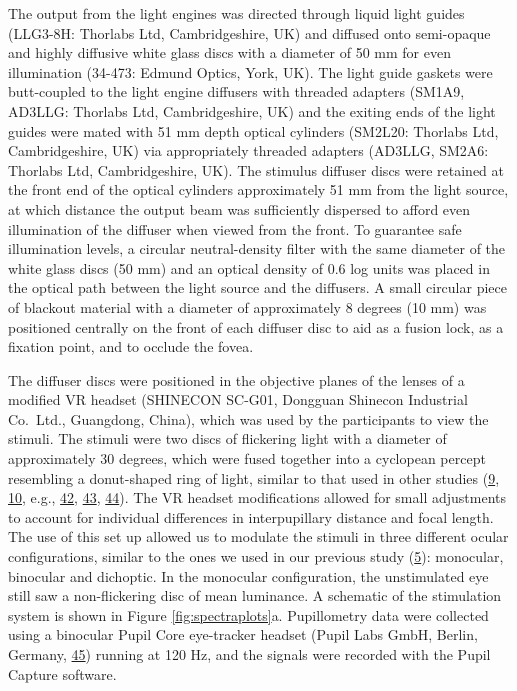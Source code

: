 \documentclass[
]{article}
\begin{document}
The output from the light engines was directed through liquid light guides (LLG3-8H: Thorlabs Ltd, Cambridgeshire, UK) and diffused onto semi-opaque and highly diffusive white glass discs with a diameter of 50 mm for even illumination (34-473: Edmund Optics, York, UK). The light guide gaskets were butt-coupled to the light engine diffusers with threaded adapters (SM1A9, AD3LLG: Thorlabs Ltd, Cambridgeshire, UK) and the exiting ends of the light guides were mated with 51 mm depth optical cylinders (SM2L20: Thorlabs Ltd, Cambridgeshire, UK) via appropriately threaded adapters (AD3LLG, SM2A6: Thorlabs Ltd, Cambridgeshire, UK). The stimulus diffuser discs were retained at the front end of the optical cylinders approximately 51 mm from the light source, at which distance the output beam was sufficiently dispersed to afford even illumination of the diffuser when viewed from the front. To guarantee safe illumination levels, a circular neutral-density filter with the same diameter of the white glass discs (50 mm) and an optical density of 0.6 log units was placed in the optical path between the light source and the diffusers. A small circular piece of blackout material with a diameter of approximately 8 degrees (10 mm) was positioned centrally on the front of each diffuser disc to aid as a fusion lock, as a fixation point, and to occlude the fovea.

The diffuser discs were positioned in the objective planes of the lenses of a modified VR headset (SHINECON SC-G01, Dongguan Shinecon Industrial Co.~Ltd., Guangdong, China), which was used by the participants to view the stimuli. The stimuli were two discs of flickering light with a diameter of approximately 30 degrees, which were fused together into a cyclopean percept resembling a donut-shaped ring of light, similar to that used in other studies (\protect\hyperlink{ref-Murray2018}{9}, \protect\hyperlink{ref-Spitschan2014}{10}, e.g., \protect\hyperlink{ref-Barrionuevo2016}{42}, \protect\hyperlink{ref-Spitschan2015}{43}, \protect\hyperlink{ref-Zele2018}{44}). The VR headset modifications allowed for small adjustments to account for individual differences in interpupillary distance and focal length. The use of this set up allowed us to modulate the stimuli in three different ocular configurations, similar to the ones we used in our previous study (\protect\hyperlink{ref-Segala2023}{5}): monocular, binocular and dichoptic. In the monocular configuration, the unstimulated eye still saw a non-flickering disc of mean luminance. A schematic of the stimulation system is shown in Figure \ref{fig:spectraplots}a. Pupillometry data were collected using a binocular Pupil Core eye-tracker headset (Pupil Labs GmbH, Berlin, Germany, \protect\hyperlink{ref-Kassner2014}{45}) running at 120 Hz, and the signals were recorded with the Pupil Capture software.
\end{document}
